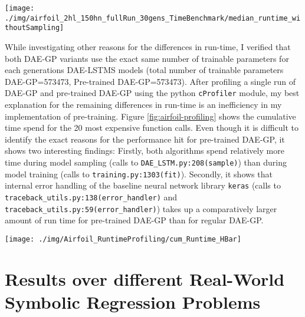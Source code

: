\documentclass[
  11pt,
]{article}
\let\origfigure\figure
\let\endorigfigure\endfigure
\renewenvironment{figure}[1][2] {
    \expandafter\origfigure\expandafter[H]
} {
    \endorigfigure
}
\begin{document}
\begin{figure}[c]

{\centering \texttt{[image: ./img/airfoil\_2hl\_150hn\_fullRun\_30gens\_TimeBenchmark/median\_runtime\_withoutSampling]} 

}

\caption{Median Runtime excluding Time for Sampling - Airfoil}\label{fig:airfoil-runtime-noSampling-total}
\end{figure}

While investigating other reasons for the differences in run-time, I verified that both DAE-GP variants use the exact same number of trainable parameters for each generations DAE-LSTMS models (total number of trainable parameters DAE-GP=573473, Pre-trained DAE-GP=573473).
After profiling a single run of DAE-GP and pre-trained DAE-GP using the python \texttt{cProfiler} module, my best explanation for the remaining differences in run-time is an inefficiency in my implementation of pre-training.
Figure \ref{fig:airfoil-profiling} shows the cumulative time spend for the 20 most expensive function calls.
Even though it is difficult to identify the exact reasons for the performance hit for pre-trained DAE-GP, it shows two interesting findings: Firstly, both algorithms spend relatively more time during model sampling (calls to \texttt{DAE\_LSTM.py:208(sample)}) than during model training (calls to \texttt{training.py:1303(fit)}).
Secondly, it shows that internal error handling of the baseline neural network library \texttt{keras} (calls to \texttt{traceback\_utils.py:138(error\_handler)} and \texttt{traceback\_utils.py:59(error\_handler)}) takes up a comparatively larger amount of run time for pre-trained DAE-GP than for regular DAE-GP.

\begin{figure}[c]

{\centering \texttt{[image: ./img/Airfoil\_RuntimeProfiling/cum\_Runtime\_HBar]} 

}

\caption{Cumulative Time consumption by Function Calls (Top 20) - Airfoil}\label{fig:airfoil-profiling}
\end{figure}

\hypertarget{results-over-different-real-world-symbolic-regression-problems}{%
\section{Results over different Real-World Symbolic Regression Problems}\label{results-over-different-real-world-symbolic-regression-problems}}
\end{document}

